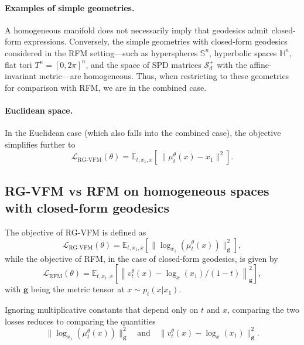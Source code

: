 \paragraph{Examples of simple geometries.} A homogeneous manifold does not necessarily imply that geodesics admit closed-form expressions. Conversely, the simple geometries with closed-form geodesics considered in the RFM setting—such as hyperspheres $\mathbb{S}^n$, hyperbolic spaces $\mathbb{H}^n$, flat tori $T^n = [0, 2\pi]^n$, and the space of SPD matrices $\mathcal{S}_d^+$ with the affine-invariant metric—are homogeneous. Thus, when restricting to these geometries for comparison with RFM, we are in the combined case.

\paragraph{Euclidean space.} In the Euclidean case (which also falls into the combined case), the objective simplifies further to  
$$
\mathcal{L}_{\text{RG-VFM}}  (\theta) = \mathbb{E}_{t,x_1,x}\left[\,\|\mu_t^{\theta}(x) - x_1\|^2\right].
$$


\subsection{RG-VFM vs RFM on homogeneous spaces with closed-form geodesics}\label{app:rgvfm_rfm}

The objective of RG-VFM is defined as  
$$
\mathcal{L}_{\text{RG-VFM}}  (\theta) = \mathbb{E}_{t,x_1,x}\left[ \|\log_{x_1}(\mu_t^{\theta}(x))\|_\mathbf{g}^2\right],
$$  
while the objective of RFM, in the case of closed-form geodesics, is given by  
$$
\mathcal{L}_{\text{RFM}}  (\theta) = \mathbb{E}_{t,x_1,x}\left[\left\|v_t^{\theta}(x) - \log_{x}(x_1)/(1-t)\right\|_\mathbf{g}^2\right],
$$  
with $\mathbf{g}$ being the metric tensor at $x \sim p_t(x | x_1)$.

Ignoring multiplicative constants that depend only on $t$ and $x$, comparing the two losses reduces to comparing the quantities  
$$
\|\log_{x_1}(\mu_t^{\theta}(x))\|_\mathbf{g}^2 \quad \text{and} \quad \|v_t^{\theta}(x) - \log_{x}(x_1)\|_\mathbf{g}^2.
$$

